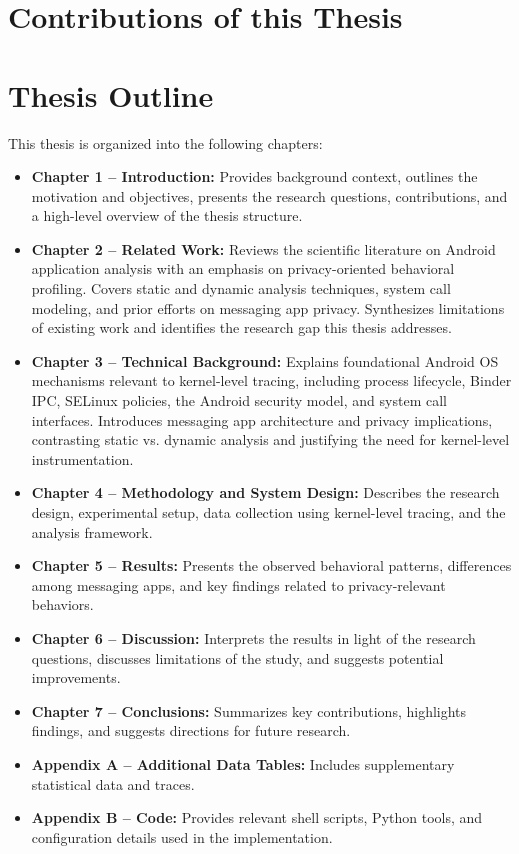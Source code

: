 \documentclass[a4paper,12pt]{report}
\begin{document}
\section{Contributions of this Thesis}

\section{Thesis Outline}
This thesis is organized into the following chapters:

\begin{itemize}
\item \textbf{Chapter 1 – Introduction:} Provides background context, outlines the motivation and objectives, presents the research questions, contributions, and a high-level overview of the thesis structure.
\item \textbf{Chapter 2 – Related Work:} Reviews the scientific literature on Android application analysis with an emphasis on privacy-oriented behavioral profiling. Covers static and dynamic analysis techniques, system call modeling, and prior efforts on messaging app privacy. Synthesizes limitations of existing work and identifies the research gap this thesis addresses.
\item \textbf{Chapter 3 – Technical Background:} Explains foundational Android OS mechanisms relevant to kernel-level tracing, including process lifecycle, Binder IPC, SELinux policies, the Android security model, and system call interfaces. Introduces messaging app architecture and privacy implications, contrasting static vs. dynamic analysis and justifying the need for kernel-level instrumentation.
\item \textbf{Chapter 4 – Methodology and System Design:} Describes the research design, experimental setup, data collection using kernel-level tracing, and the analysis framework.
\item \textbf{Chapter 5 – Results:} Presents the observed behavioral patterns, differences among messaging apps, and key findings related to privacy-relevant behaviors.
\item \textbf{Chapter 6 – Discussion:} Interprets the results in light of the research questions, discusses limitations of the study, and suggests potential improvements.
\item \textbf{Chapter 7 – Conclusions:} Summarizes key contributions, highlights findings, and suggests directions for future research.
\item \textbf{Appendix A – Additional Data Tables:} Includes supplementary statistical data and traces.
\item \textbf{Appendix B – Code:} Provides relevant shell scripts, Python tools, and configuration details used in the implementation.
\end{itemize}
\end{document}
